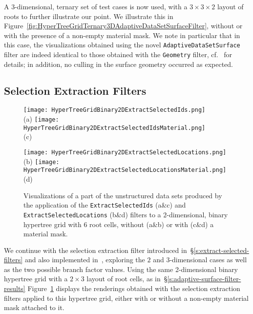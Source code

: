 A $3$-dimensional, ternary set of test cases is now used,
with a $3\times3\times2$ layout of roots to further illustrate our point.
We illustrate this in
Figure~\ref{fig:HyperTreeGridTernary3DAdaptiveDataSetSurfaceFilter},
without or with the presence of a non-empty material mask.
We note in particular that in this case, the visualizations obtained
using the novel \texttt{AdaptiveDataSetSurface} filter are indeed
identical to those obtained with the \texttt{Geometry} filter,
cf.~\cite{harel:17} for details; in addition, no culling in the
surface geometry occurred as expected.
\subsection{Selection Extraction Filters}
\begin{figure}[h!]
\centering
\begin{minipage}[t]{0.48\columnwidth}
\centering
\vspace{0pt}
\texttt{[image: HyperTreeGridBinary2DExtractSelectedIds.png]}\\
(a)
\texttt{[image: HyperTreeGridBinary2DExtractSelectedIdsMaterial.png]}\\
(c)
\end{minipage}
\hfil
\begin{minipage}[t]{0.48\columnwidth}
\centering
\vspace{0pt}
\texttt{[image: HyperTreeGridBinary2DExtractSelectedLocations.png]}\\
(b)
\texttt{[image: HyperTreeGridBinary2DExtractSelectedLocationsMaterial.png]}\\
(d)
\end{minipage}
\caption{Visualizations of a part of the unstructured data sets
produced by the application of the \texttt{ExtractSelectedIds} (a\&c) and
\texttt{ExtractSelectedLocations} (b\&d) filters to a
$2$-dimensional, binary hypertree grid with 6 root cells, without
(a\&b) or with (c\&d) a material mask.}
\label{fig:HyperTreeGridBinary2DDataSetSurfaceFilter}
\end{figure}

We continue with the selection extraction filter introduced
in~\S\ref{s:extract-selected-filters} and also implemented in~\VTK{},
exploring the $2$ and $3$-dimensional cases as well as the two
possible branch factor values.
Using the same 2-dimensional binary hypertree grid with a $2\times3$
layout of root cells, as in~\S\ref{s:adaptive-surface-filter-results}
Figure~\ref{fig:HyperTreeGridBinary2DDataSetSurfaceFilter} displays
the renderings obtained with the selection extraction filters applied
to this hypertree grid, either with or without a non-empty
material mask attached to it.


